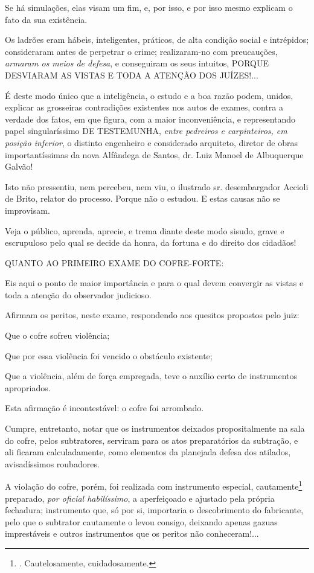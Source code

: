 Se há simulações, elas visam um fim, e, por isso, e por isso mesmo
explicam o fato da sua existência.

Os ladrões eram hábeis, inteligentes, práticos, de alta condição social
e intrépidos; consideraram antes de perpetrar o crime; realizaram-no com
preucauções, \emph{armaram os meios de defesa}, e conseguiram os seus
intuitos, PORQUE DESVIARAM AS VISTAS E TODA A ATENÇÃO DOS JUÍZES!...

É deste modo único que a inteligência, o estudo e a boa razão podem,
unidos, explicar as grosseiras contradições existentes nos autos de
exames, contra a verdade dos fatos, em que figura, com a maior
inconveniência, e representando papel singularíssimo DE TESTEMUNHA,
\emph{entre pedreiros e carpinteiros, em posição inferior}, o distinto
engenheiro e considerado arquiteto, diretor de obras importantíssimas da
nova Alfândega de Santos, dr. Luiz Manoel de Albuquerque Galvão!

Isto não pressentiu, nem percebeu, nem viu, o ilustrado sr.
desembargador Accioli de Brito, relator do processo. Porque não o
estudou. E estas causas não se improvisam.

Veja o público, aprenda, aprecie, e trema diante deste modo sisudo,
grave e escrupuloso pelo qual se decide da honra, da fortuna e do
direito dos cidadãos!

QUANTO AO PRIMEIRO EXAME DO COFRE-FORTE:

Eis aqui o ponto de maior importância e para o qual devem convergir as
vistas e toda a atenção do observador judicioso.

Afirmam os peritos, neste exame, respondendo aos quesitos propostos pelo
juiz:

Que o cofre sofreu violência;

Que por essa violência foi vencido o obstáculo existente;

Que a violência, além de força empregada, teve o auxílio certo de
instrumentos apropriados.

Esta afirmação é incontestável: o cofre foi arrombado.

Cumpre, entretanto, notar que os instrumentos deixados propositalmente
na sala do cofre, pelos subtratores, serviram para os atos preparatórios
da subtração, e ali ficaram calculadamente, como elementos da planejada
defesa dos atilados, avisadíssimos roubadores.

A violação do cofre, porém, foi realizada com instrumento especial,
cautamente\footnote{. Cautelosamente, cuidadosamente.} preparado,
\emph{por oficial habilíssimo}, a aperfeiçoado e ajustado pela própria
fechadura; instrumento que, só por si, importaria o descobrimento do
fabricante, pelo que o subtrator cautamente o levou consigo, deixando
apenas gazuas imprestáveis e outros instrumentos que os peritos não
conheceram!...

